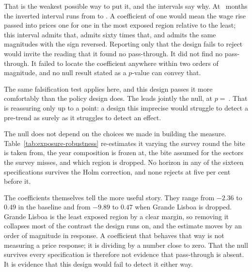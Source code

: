 That is the weakest possible way to put it, and the intervals say why. At
\ExposureWidestIntervalHorizon{}~months the inverted interval runs from
\ExposureWidestIntervalLower{} to \ExposureWidestIntervalUpper{}. A coefficient
of one would mean the wage rise passed into prices one for one in the most
exposed region relative to the least; this interval admits that, admits sixty
times that, and admits the same magnitudes with the sign reversed. Reporting
only that the design fails to reject would invite the reading that it found no
pass-through. It did not find no pass-through. It failed to locate the
coefficient anywhere within two orders of magnitude, and no null result stated
as a $p$-value can convey that.

The same falsification test applies here, and this design passes it more
comfortably than the policy design does. The \ExposurePreTrendLeads{} leads
jointly \ExposurePreTrendRejects{} the null, at $p=\ $\ExposurePreTrendP{}.
That is reassuring only up to a point: a design this imprecise would struggle to
detect a pre-trend as surely as it struggles to detect an effect.

The null does not depend on the choices we made in building the measure.
Table~\ref{tab:exposure-robustness} re-estimates it varying the survey round the
bite is taken from, the year composition is frozen at, the bite assumed for the
sectors the survey misses, and which region is dropped. No horizon in any of the
sixteen specifications survives the Holm correction, and none rejects at five
per cent before it.

\begin{table}[htbp]
  \centering
  \caption{The exposure design under alternative construction choices.
  Coefficient range is across horizons within a specification; rejections are at
  five per cent, before and after the Holm correction across the horizon family.}
  \label{tab:exposure-robustness}
  
\end{table}

The coefficients themselves tell the more useful story. They range from
$-2.36$ to $0.49$ in the baseline and from $-9.89$ to $0.47$ when Grande Lisboa
is dropped. Grande Lisboa is the least exposed region by a clear margin, so
removing it collapses most of the contrast the design runs on, and the estimate
moves by an order of magnitude in response. A coefficient that behaves that way
is not measuring a price response; it is dividing by a number close to zero.
That the null survives every specification is therefore not evidence that
pass-through is absent. It is evidence that this design would fail to detect it
either way.

